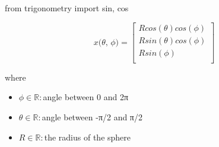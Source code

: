 \documentclass[12pt]{article}
\begin{document}
from trigonometry import sin, cos

\[
\textit{x(θ, ϕ)} = \begin{bmatrix}
\textit{R}cos(\textit{θ})cos(\textit{ϕ})\\
\textit{R}sin(\textit{θ})cos(\textit{ϕ})\\
\textit{R}sin(\textit{ϕ})\\
\end{bmatrix}
\]

where
\begin{itemize}
\item $\textit{ϕ} \in \mathbb{{R}}:$angle between 0 and 2π
\item $\textit{θ} \in \mathbb{{R}}:$angle between -π/2 and π/2
\item $\textit{R} \in \mathbb{{R}}:$the radius of the sphere
\end{itemize}
\end{document}
